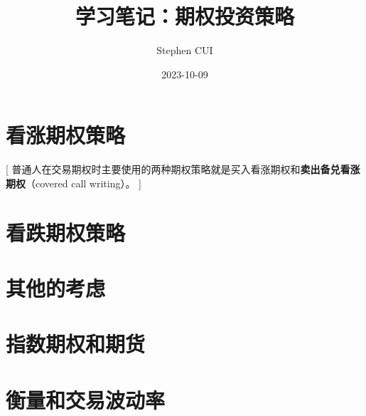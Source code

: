 \documentclass{book}
\title{学习笔记：期权投资策略}
\author{Stephen CUI}
\date{2023-10-09}
\begin{document}
\maketitle
\frontmatter
\tableofcontents
\mainmatter
% 
\part{看涨期权策略}[
    普通人在交易期权时主要使用的两种期权策略就是买入看涨期权和\textbf{卖出备兑看涨期权}（covered call writing）。
]
% 

\part{看跌期权策略}
\part{其他的考虑}
\part{指数期权和期货}
\part{衡量和交易波动率}
\end{document}

